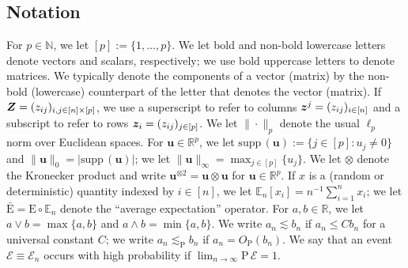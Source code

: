 \documentclass{uwstat572}
\theoremstyle{definition}
\theoremstyle{remark}
\newcommand{\R}{\ensuremath{\mathbb{R}}}
\newcommand{\N}{\mathbb{N}}
\newcommand{\gb}{\beta}
\newcommand{\gep}{\epsilon}
\newcommand{\gs}{\sigma}
\newcommand{\supp}{\mathrm{supp} \,}
\newcommand{\Prb}{\mathrm{P}}
\newcommand{\E}{\mathrm{E}}
\newcommand{\En}{\bar{\E}}
\newcommand{\Ex}{\mathbb{E}}
\newcommand{\Exn}{\Ex_n}
\newcommand{\bs}[1]{\boldsymbol{#1}}
\numberwithin{equation}{section}
\begin{document}
%
\subsection{Notation}
\renewcommand{\d}{\bs{d}}
\newcommand{\dhat}{\hat{\d}}
\newcommand{\dhatc}{\hat{d}}
\newcommand{\dhati}{\dhatc_i}
\newcommand{\db}{\d_{\regb}}
\renewcommand{\u}{\bs{u}}
\newcommand{\x}{\bs{x}}
\newcommand{\y}{\bs{y}}
\newcommand{\U}{\bs{U}}
\newcommand{\inn}{\in[n]}
\newcommand{\event}{\mathcal{E}}
\newcommand{\kp}{\otimes}
\newcommand{\kpt}{\kp2}

For $p\in\N$, we let $[p] := \{1,\ldots,p\}$. We let bold and non-bold lowercase letters denote vectors and scalars, respectively; we use bold uppercase letters to denote matrices. We typically denote the components of a vector (matrix) by the non-bold (lowercase) counterpart of the letter that denotes the vector (matrix). If $\Z = (z_{ij})_{i,j\in[n]\times[p]}$, we use a superscript to refer to columns $\z^j = (z_{ij})_{i\inn}$ and a subscript to refer to rows $\z_i = (z_{ij})_{j\in[p]}$. We let $\|\cdot\|_p$ denote the usual $\ell_p$ norm over Euclidean spaces.  For $\u \in \R^p$, we let $\supp(\u) := \{j\in[p]: u_j \neq 0\}$ and $\|\u\|_0 = |\supp(\u)|$; we let $\|\u\|_\infty = \max_{j\in[p]} \{u_j\}$. We let $\otimes$ denote the Kronecker product and write $\u^{\kpt} = \u \kp \u$ for $\u\in\R^p$. If $x$ is a (random or deterministic) quantity indexed by $i\inn$, we let $\Exn[x_i] = n^{-1}\sum_{i=1}^n x_i$; we let $\En = \E\circ\Exn$ denote the ``average expectation'' operator. For $a,b\in\R$, we let $a\vee b = \max\{a,b\}$ and $a\wedge b = \min\{a,b\}$. We write $a_n \lesssim b_n$ if $a_n \leq Cb_n$ for a universal constant $C$; we write $a_n \lesssim_\Prb b_n$ if $a_n = O_\Prb(b_n)$. We say that an event $\event \equiv \event_n$ occurs with high probability if $\lim_{n\to\infty} \Prb \, \event = 1$. 



%


\newcommand{\px}{p_{\x}}
\newcommand{\pu}{p_{\u}}
\newcommand{\pun}{p_{\u,n}}
\newcommand{\fhat}{\hat{f}}
\newcommand{\regb}{\bs{\gb}}
\newcommand{\regbh}{\hat{\regb}}
\newcommand{\fb}{f_{\regb}}
\newcommand{\fbn}{f_{\regb, n}}
\newcommand{\fbhat}{\hat{\fb}}
\newcommand{\rem}{\bs{r}}
\newcommand{\remc}{r}
\newcommand{\remi}{\remc_i}
\newcommand{\rfb}{r_{\famb}}
\newcommand{\rc}{c_r}
\newcommand{\rb}{r_{\regb}}
\newcommand{\rbn}{r_{\regb,n}}
\newcommand{\rfs}{r_{\fams}}
\newcommand{\Xs}{\mathcal{X}}
\newcommand{\Zs}{\mathcal{Z}}
\newcommand{\Fs}{\mathcal{F}}
\newcommand{\Bs}{\mathcal{B}}
\newcommand{\famb}{\Fs_\Bs}
\newcommand{\fams}{\Fs_\sb}
\newcommand{\Sb}{S}
\newcommand{\Us}{\mathcal{U}}
\renewcommand{\sb}{s}
\newcommand{\gramhat}{\hat{\bs{\Sigma}}}
\newcommand{\tune}{\lambda}
\newcommand{\ersi}{\gep_i}
\newcommand{\sd}{\gs}
\end{document}
